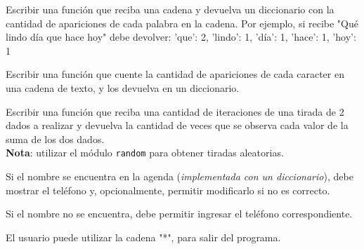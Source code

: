 \begin{partes}
  \item Escribir una función que reciba una cadena y devuelva un diccionario con
la cantidad de apariciones de cada palabra en la cadena.  Por ejemplo, si
recibe "Qué lindo día que hace hoy" debe devolver: { 'que': 2, 'lindo': 1,
'día': 1, 'hace': 1, 'hoy': 1}
  \item Escribir una función que cuente la cantidad de apariciones de cada
caracter en una cadena de texto, y los devuelva en un diccionario.
  \item Escribir una función que reciba una cantidad de iteraciones de una tirada
de 2 dados a realizar y devuelva la cantidad de veces que se observa cada valor
de la suma de los dos dados. \\
{\bf Nota}: utilizar el módulo \verb!random! para obtener tiradas aleatorias.
\end{partes}

\begin{partes}
  \item Si el nombre se encuentra en la agenda ({\it implementada con un
diccionario}), debe mostrar el teléfono y, opcionalmente, permitir
modificarlo si no es correcto.
  \item Si el nombre no se encuentra, debe permitir ingresar el teléfono
correspondiente.
\end{partes}
El usuario puede utilizar la cadena "*", para salir del programa.


